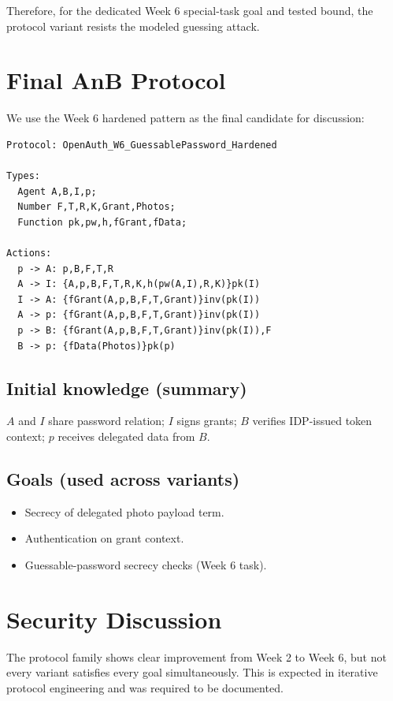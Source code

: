 \documentclass[11pt,a4paper]{article}
\begin{document}
Therefore, for the dedicated Week 6 special-task goal and tested bound, the protocol variant resists the modeled guessing attack.

\section{Final AnB Protocol}

We use the Week 6 hardened pattern as the final candidate for discussion:

\begin{lstlisting}
Protocol: OpenAuth_W6_GuessablePassword_Hardened

Types:
  Agent A,B,I,p;
  Number F,T,R,K,Grant,Photos;
  Function pk,pw,h,fGrant,fData;

Actions:
  p -> A: p,B,F,T,R
  A -> I: {A,p,B,F,T,R,K,h(pw(A,I),R,K)}pk(I)
  I -> A: {fGrant(A,p,B,F,T,Grant)}inv(pk(I))
  A -> p: {fGrant(A,p,B,F,T,Grant)}inv(pk(I))
  p -> B: {fGrant(A,p,B,F,T,Grant)}inv(pk(I)),F
  B -> p: {fData(Photos)}pk(p)
\end{lstlisting}

\subsection*{Initial knowledge (summary)}
$A$ and $I$ share password relation; $I$ signs grants; $B$ verifies IDP-issued token context; $p$ receives delegated data from $B$.

\subsection*{Goals (used across variants)}
\begin{itemize}
  \item Secrecy of delegated photo payload term.
  \item Authentication on grant context.
  \item Guessable-password secrecy checks (Week 6 task).
\end{itemize}

\section{Security Discussion}

The protocol family shows clear improvement from Week 2 to Week 6, but not every variant satisfies every goal simultaneously.
This is expected in iterative protocol engineering and was required to be documented.
\end{document}
